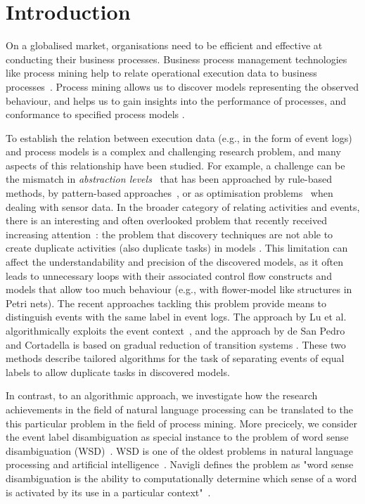 \section{Introduction}
\label{sec:intro}
On a globalised market, organisations need to be efficient and effective at conducting their business processes. Business process management technologies like process mining help to relate operational execution data to business processes~\cite{DBLP:books/daglib/0031128}. Process mining allows us to discover models representing the observed behaviour, and helps us to gain insights into the performance of processes, and conformance to specified process models \cite{DBLP:books/sp/Aalst16}.

To establish the relation between execution data (e.g., in the form of event logs) and process models is a complex and challenging research problem, and many aspects of this relationship have been studied. For example, a challenge can be the mismatch in \emph{abstraction levels}~\cite{DBLP:journals/is/0001MW14} that has been approached by rule-based methods, by pattern-based approaches~\cite{DBLP:conf/bpm/MannhardtLRAT16}, or as optimisation problems~\cite{DBLP:conf/caise/SenderovichRGMM16} when dealing with sensor data. 
In the broader category of relating activities and events, there is an interesting and often overlooked problem that recently received increasing attention~\cite{DBLP:conf/bpm/LuFBA16,DBLP:conf/bpm/PedroC16}: the problem that discovery techniques are not able to create duplicate activities (also duplicate tasks) in models \cite{DBLP:journals/topnoc/Carmona12,tie2009clustering,XiaoHui2009alphaStartStar}. This limitation can affect the understandability and precision of the discovered models, as it often leads to unnecessary loops with their associated control flow constructs and models that allow too much behaviour (e.g., with flower-model like structures in Petri nets).
The recent approaches tackling this problem provide means to distinguish events with the same label in event logs. The approach by Lu et al. algorithmically exploits the event context~\cite{DBLP:conf/bpm/LuFBA16}, and the approach by de San Pedro and Cortadella is based on gradual reduction of transition systems \cite{DBLP:conf/bpm/PedroC16}. These two methods describe tailored algorithms for the task of separating events of equal labels to allow duplicate tasks in discovered models.

In contrast, to an algorithmic approach, we investigate how the research achievements in the field of natural language processing can be translated to the this particular problem in the field of process mining.
More precicely, we consider the event label disambiguation as special instance to the problem of word sense disambiguation (WSD)~\cite{DBLP:journals/csur/Navigli09}. WSD is one of the oldest problems in natural language processing and artificial intelligence~\cite{article_from_50s}. 
Navigli defines the problem as "word sense disambiguation is the ability to computationally determine which sense of a word is activated by its use in a particular context"~\cite{DBLP:journals/csur/Navigli09}. 

